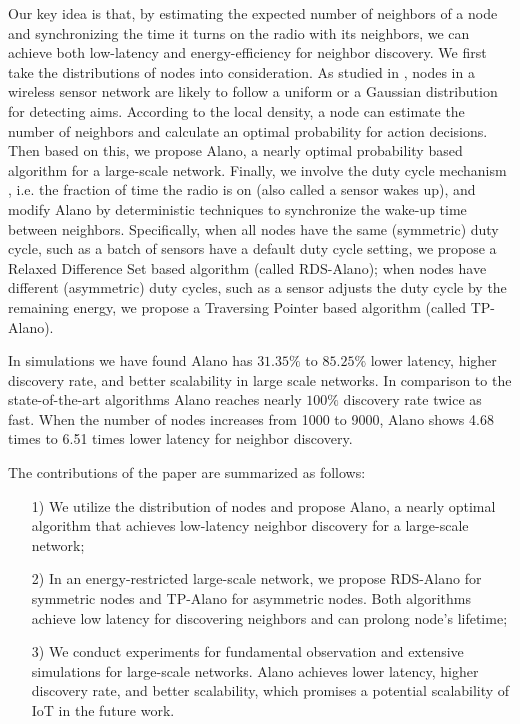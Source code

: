 Our key idea is that, by estimating the expected number of neighbors of a node and synchronizing the time it turns on the radio with its neighbors, 
we can achieve both low-latency and energy-efficiency for neighbor discovery. 
We first take the distributions of nodes into consideration. As studied in \cite{wang2013gaussian}, nodes in a wireless sensor network are likely to follow a uniform or a Gaussian distribution for detecting aims. %
According to the local density, a node can estimate the number of neighbors and calculate an optimal probability for action decisions. Then based on this, we propose Alano, %
a nearly optimal probability based algorithm for a large-scale network. Finally, we involve the duty cycle mechanism \cite{zhang2017performance}, i.e. the fraction of time the radio is on (also called a sensor wakes up), and modify Alano by deterministic techniques to synchronize the wake-up time between neighbors. Specifically, when all nodes have the same (symmetric) duty cycle, such as a batch of sensors have a default duty cycle setting, we propose a Relaxed Difference Set based algorithm (called RDS-Alano); when nodes have different (asymmetric) duty cycles, such as a sensor adjusts the duty cycle by the remaining energy, we propose a Traversing Pointer based algorithm (called TP-Alano).

In simulations we have found Alano has $31.35\%$ to $ 85.25\%$ lower latency, higher discovery rate, and better scalability in large scale networks. %
In comparison to the state-of-the-art algorithms \cite{you2011aloha, sun2014hello, chen2015heterogeneous, bakht2012searchlight}
Alano reaches nearly $100\%$ discovery rate twice as fast. 
When the number of nodes increases from 1000 to 9000, 
Alano shows 4.68 times to 6.51 times lower latency for neighbor discovery.

The contributions of the paper are summarized as follows:
\begin{itemize}
\item[1)] We utilize the distribution of nodes and propose Alano, a nearly optimal algorithm that achieves low-latency neighbor discovery for a large-scale network;
\item[2)] In an energy-restricted large-scale network, we propose RDS-Alano for symmetric nodes and TP-Alano for asymmetric nodes. Both algorithms achieve low latency for discovering neighbors and can prolong node's lifetime;
\item[3)] We conduct experiments for fundamental observation and extensive simulations for large-scale networks.  Alano achieves lower latency, higher discovery rate, and better scalability,
which promises a potential scalability of IoT in the future work.  %
\end{itemize}

